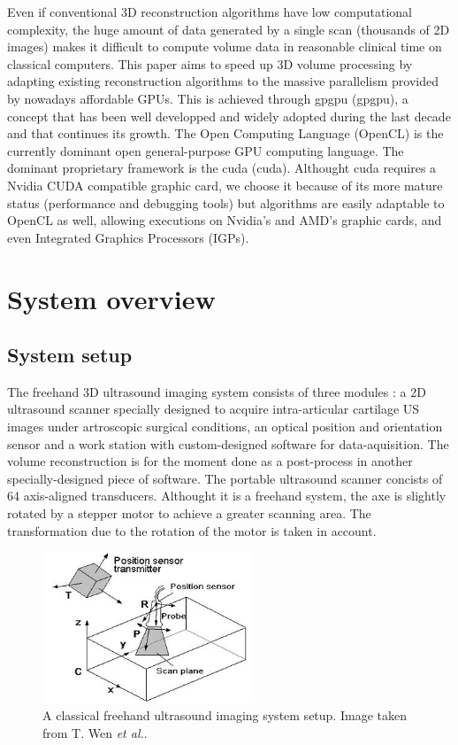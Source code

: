 \documentclass[12pt,journal,compsoc]{IEEEtran}
\begin{document}
Even if conventional 3D reconstruction algorithms have low computational complexity, the huge amount of data generated by a single scan (thousands of 2D images) makes it difficult to compute volume data in reasonable clinical time on classical computers.
This paper aims to speed up 3D volume processing by adapting existing reconstruction algorithms to the massive parallelism provided by nowadays affordable GPUs. This is achieved through \acl{gpgpu} (\ac{gpgpu}), a concept that has been well developped and widely adopted during the last decade and that continues its growth.
The Open Computing Language (OpenCL) is the currently dominant open general-purpose GPU computing language. The dominant proprietary framework is the \acl{cuda} (\ac{cuda}).
Althought \ac{cuda} requires a Nvidia CUDA compatible graphic card, we choose it because of its more mature status (performance and debugging tools) but algorithms are easily adaptable to OpenCL as well, allowing executions on Nvidia's and AMD's graphic cards, and even Integrated Graphics Processors (IGPs).

\section{System overview}

\subsection{System setup}

The freehand 3D ultrasound imaging system consists of three modules : a 2D ultrasound scanner specially designed to acquire intra-articular cartilage US images under artroscopic surgical conditions, an optical position and orientation sensor and a work station with custom-designed software for data-aquisition. The volume reconstruction is for the moment done as a post-process in another specially-designed piece of software.
The portable ultrasound scanner concists of 64 axis-aligned transducers. Althought it is a freehand system, the axe is slightly rotated by a stepper motor to achieve a greater scanning area. The transformation due to the rotation of the motor is taken in account.

\begin{figure}[!h]
\centering
\includegraphics[width=2.5in]{freehand}
\caption{A classical freehand ultrasound imaging system setup. Image taken from T. Wen \textit{et al.}\cite{2}.}
\label{fig_1}
\end{figure}
\end{document}
